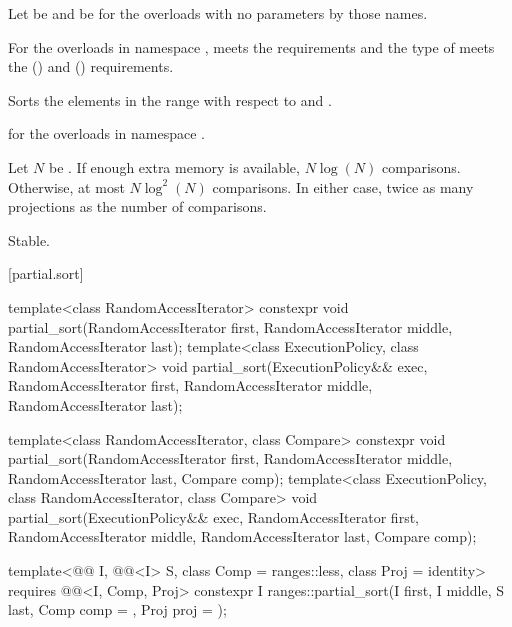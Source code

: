 \begin{itemdescr}
\pnum
Let  be 
and  be 
for the overloads with no parameters by those names.

\pnum
\expects
For the overloads in namespace ,
 meets
the  requirements and
the type of  meets
the  () and
 () requirements.

\pnum
\effects
Sorts the elements in the range 
with respect to  and .

\pnum
\returns
{} for the overloads in namespace .

\pnum
\complexity
Let $N$ be .
If enough extra memory is available, $N \log(N)$ comparisons.
Otherwise, at most $N \log^2(N)$ comparisons.
In either case, twice as many projections as the number of comparisons.

\pnum
\remarks
Stable.
\end{itemdescr}

[partial.sort]{}

%
\begin{itemdecl}
template<class RandomAccessIterator>
  constexpr void partial_sort(RandomAccessIterator first,
                              RandomAccessIterator middle,
                              RandomAccessIterator last);
template<class ExecutionPolicy, class RandomAccessIterator>
  void partial_sort(ExecutionPolicy&& exec,
                    RandomAccessIterator first,
                    RandomAccessIterator middle,
                    RandomAccessIterator last);

template<class RandomAccessIterator, class Compare>
  constexpr void partial_sort(RandomAccessIterator first,
                              RandomAccessIterator middle,
                              RandomAccessIterator last,
                              Compare comp);
template<class ExecutionPolicy, class RandomAccessIterator, class Compare>
  void partial_sort(ExecutionPolicy&& exec,
                    RandomAccessIterator first,
                    RandomAccessIterator middle,
                    RandomAccessIterator last,
                    Compare comp);

template<@@ I, @@<I> S, class Comp = ranges::less,
         class Proj = identity>
  requires @@<I, Comp, Proj>
  constexpr I
    ranges::partial_sort(I first, I middle, S last, Comp comp = {}, Proj proj = {});
\end{itemdecl}

